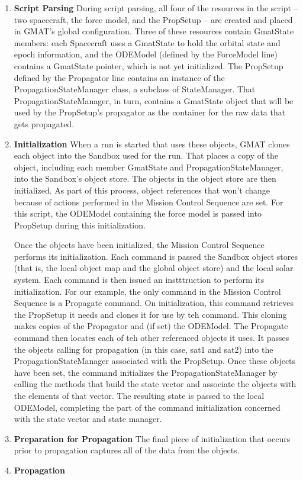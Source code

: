 \begin{enumerate}
\item \textbf{Script Parsing}  During script parsing, all four of the resources in the script --
two spacecraft, the force model, and the PropSetup -- are created and placed in GMAT's global
configuration.  Three of these resources contain GmatState members: each Spacecraft uses a
GmatState to hold the orbital state and epoch information, and the ODEModel (defined by the
ForceModel line) contains a GmatState pointer, which is not yet initialized.  The PropSetup defined
by the Propagator line contains an instance of the PropagationStateManager class, a subclass of
StateManager.  That PropagationStateManager, in turn, contains a GmatState object that will be used
by the PropSetup's propagator as the container for the raw data that gets propagated.

\item \textbf{Initialization}  When a run is started that uses these objects, GMAT clones each
object into the Sandbox used for the run.  That places a copy of the object, including each member
GmatState and PropagationStateManager, into the Sandbox's object store.  The objects in the object
store are then initialized.  As part of this process, object references that won't change because
of actions performed in the Mission Control Sequence are set.  For this script, the ODEModel
containing the force model is passed into PropSetup during this initialization.

Once the objects have been initialized, the Mission Control Sequence performs its initialization.
Each command is passed the Sandbox object stores (that is, the local object map and the global
object store) and the local solar system.  Each command is then issued an instttruction to perform
its initialization.  For our example, the only command in the Mission Control Sequence is a
Propagate command.  On initialization, this command retrieves the PropSetup it needs and clones it
for use by teh command.  This cloning makes copies of the Propagator and (if set) the ODEModel.
The Propagate command then locates each of teh other referenced objects it uses.  It passes the
objects calling for propagation (in this case, sat1 and sat2) into the PropagationStateManager
associated with the PropSetup.  Once these objects have been set, the command initializes the
PropagationStateManager by calling the methods that build the state vector and associate the
objects with the elements of that vector.  The resulting state is passed to the local ODEModel,
completing the part of the command initialization concerned with the state vector and state manager.

\item \textbf{Preparation for Propagation}  The final piece of initialization that occurs prior to
propagation captures all of the data from the objects.

\item \textbf{Propagation}
\end{enumerate}



